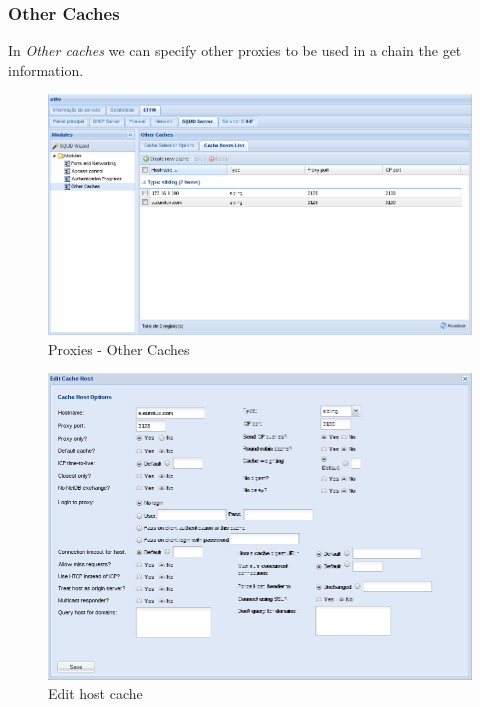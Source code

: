 \subsubsection{Other Caches}

In \textit{Other caches} we can specify other proxies to be used in a chain the get information.

\begin{figure}[H]
    \begin{center}
    \includegraphics[scale=0.38]{screenshots/etfw/etfw_squid_othercaches_01.png}
    \caption{Proxies - Other Caches}
    \label{fig:etfw_squid_othercaches_01}
    \end{center}
\end{figure}

\begin{figure}[H]
    \begin{center}
    \includegraphics[scale=0.38]{screenshots/etfw/etfw_squid_othercaches_02.png}
    \caption{Edit host cache}
    \label{fig:etfw_squid_othercaches_01}
    \end{center}
\end{figure}

